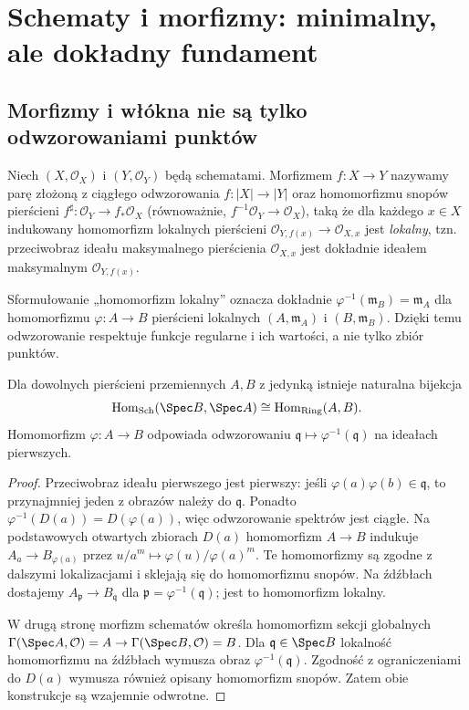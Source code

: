 \section{Schematy i morfizmy: minimalny, ale dokładny fundament}
\label{sec:ga5-schematy}

\subsection{Morfizmy i włókna nie są tylko odwzorowaniami punktów}

\begin{definicja}
\label{def:ga5-morfizm}
Niech $(X,\mathcal O_X)$ i $(Y,\mathcal O_Y)$ będą schematami.
Morfizmem $f:X\to Y$ nazywamy parę złożoną z ciągłego odwzorowania
$f:|X|\to|Y|$ oraz homomorfizmu snopów pierścieni
$f^\sharp:\mathcal O_Y\to f_*\mathcal O_X$ (równoważnie,
$f^{-1}\mathcal O_Y\to\mathcal O_X$), taką że dla każdego $x\in X$
indukowany homomorfizm lokalnych pierścieni
$\mathcal O_{Y,f(x)}\to\mathcal O_{X,x}$ jest \emph{lokalny}, tzn.
przeciwobraz ideału maksymalnego pierścienia $\mathcal O_{X,x}$
jest dokładnie ideałem maksymalnym $\mathcal O_{Y,f(x)}$.
\end{definicja}

Sformułowanie „homomorfizm lokalny” oznacza dokładnie
$\varphi^{-1}(\mathfrak m_B)=\mathfrak m_A$ dla homomorfizmu
$\varphi:A\to B$ pierścieni lokalnych $(A,\mathfrak m_A)$ i
$(B,\mathfrak m_B)$. Dzięki temu odwzorowanie respektuje funkcje
regularne i ich wartości, a nie tylko zbiór punktów.

\begin{stwierdzenie}
\label{st:ga5-affine-morphism}
Dla dowolnych pierścieni przemiennych $A,B$ z jedynką istnieje
naturalna bijekcja
\[
 \operatorname{Hom}_{\mathrm{Sch}}(\Spec B,\Spec A)
 \cong\operatorname{Hom}_{\mathrm{Ring}}(A,B).
\]
Homomorfizm $\varphi:A\to B$ odpowiada odwzorowaniu
$\mathfrak q\mapsto\varphi^{-1}(\mathfrak q)$ na ideałach pierwszych.
\end{stwierdzenie}
\begin{proof}
Przeciwobraz ideału pierwszego jest pierwszy: jeśli
$\varphi(a)\varphi(b)\in\mathfrak q$, to przynajmniej jeden
z obrazów należy do $\mathfrak q$. Ponadto
$\varphi^{-1}(D(a))=D(\varphi(a))$, więc odwzorowanie spektrów
jest ciągłe. Na podstawowych otwartych zbiorach $D(a)$
homomorfizm $A\to B$ indukuje
$A_a\to B_{\varphi(a)}$ przez $u/a^m\mapsto\varphi(u)/\varphi(a)^m$.
Te homomorfizmy są zgodne z dalszymi lokalizacjami i sklejają się
do homomorfizmu snopów. Na źdźbłach dostajemy
$A_{\mathfrak p}\to B_{\mathfrak q}$ dla
$\mathfrak p=\varphi^{-1}(\mathfrak q)$; jest to homomorfizm lokalny.

W drugą stronę morfizm schematów określa homomorfizm sekcji
globalnych $\Gamma(\Spec A,\mathcal O)=A\to
\Gamma(\Spec B,\mathcal O)=B$. Dla $\mathfrak q\in\Spec B$
lokalność homomorfizmu na źdźbłach wymusza obraz
$\varphi^{-1}(\mathfrak q)$. Zgodność z ograniczeniami do
$D(a)$ wymusza również opisany homomorfizm snopów.
Zatem obie konstrukcje są wzajemnie odwrotne.
\end{proof}

